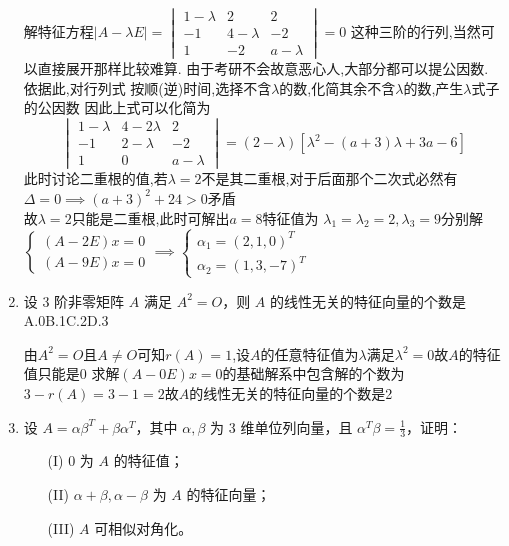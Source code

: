 \documentclass[12pt, a4paper, oneside, UTF8]{ctexbook}
\begin{document}
\begin{enumerate}
    \begin{solution}[转圈化简]
    解特征方程$\left|A-\lambda E\right| = \begin{vmatrix}
        1-\lambda & 2 & 2 \\
        -1 & 4-\lambda & -2 \\
        1 & -2 & a-\lambda 
    \end{vmatrix} = 0$
    这种三阶的行列,当然可以直接展开那样比较难算. 由于考研不会故意恶心人,大部分都可以提公因数. 依据此,对行列式
    按顺(逆)时间,选择{\color{red}不含$\lambda$的数,化简其余不含$\lambda$的数,产生$\lambda$式子的公因数} 
    因此上式可以化简为 
    $$
    \begin{vmatrix}
        1-\lambda & 4 - 2\lambda & 2 \\
        -1 & 2-\lambda & -2 \\
        1 & 0 & a-\lambda 
    \end{vmatrix} = (2-\lambda)\left[\lambda^2-(a+3)\lambda+3a-6\right]
    $$
    此时讨论二重根的值,若$\lambda=2$不是其二重根,对于后面那个二次式必然有$\Delta=0\implies (a+3)^2+24>0$矛盾\\
    故$\lambda=2$只能是二重根,此时可解出$a=8$特征值为
    $\lambda_1=\lambda_2=2,\lambda_3=9$分别解$\begin{cases}
        (A-2E)x = 0 \\
        (A-9E)x = 0 
    \end{cases}\implies \begin{cases}
        \alpha_1 = (2,1,0)^T \\
        \alpha_2 = (1,3,-7)^T
    \end{cases}$
    \end{solution}
    

    \item 设 3 阶非零矩阵 $A$ 满足 $A^2 = O$，则 $A$ 的线性无关的特征向量的个数是 \\
    A.0\qquad B.1\qquad C.2\qquad D.3
    
    \begin{solution}
    由$A^2=O$且$A\neq O$可知$r(A)=1$,设$A$的任意特征值为$\lambda$满足$\lambda^2=0$故$A$的特征值只能是$0$
    求解$(A-0E)x=0$的基础解系中包含解的个数为$3-r(A)=3-1=2$故$A$的线性无关的特征向量的个数是2
    \end{solution}
    
    \item 设 $A = \alpha \beta^T + \beta \alpha^T$，其中 $\alpha, \beta$ 为 3 维单位列向量，且 $\alpha^T \beta = \frac{1}{3}$，证明：
    \begin{enumerate}
        \item [(I)] 0 为 $A$ 的特征值；
        \item [(II)] $\alpha + \beta, \alpha - \beta$ 为 $A$ 的特征向量；
        \item [(III)] $A$ 可相似对角化。
    \end{enumerate}
    

\end{enumerate}
\end{document}
